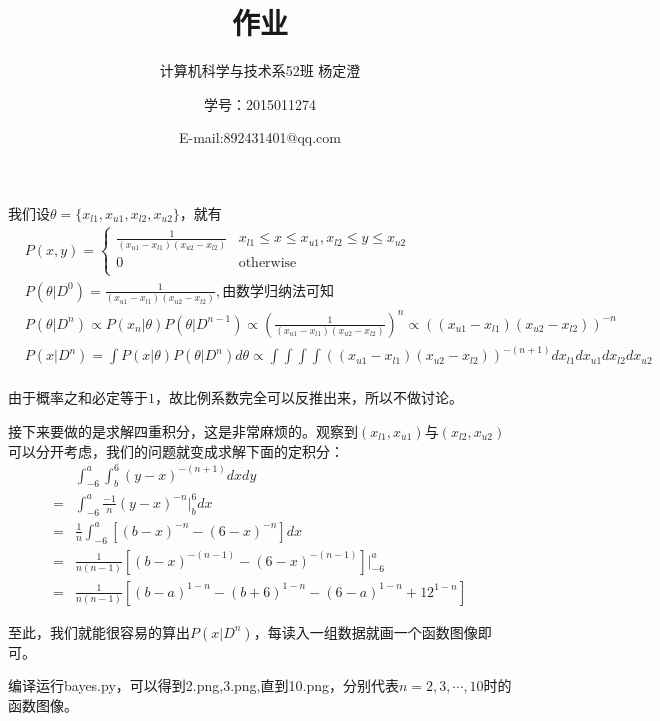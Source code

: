 \documentclass{ctexart}
\begin{document}
\title{作业}
\author{计算机科学与技术系52班 杨定澄 \and 学号：2015011274 \and E-mail:892431401@qq.com}
\date{}
\maketitle
我们设$\theta=\{x_{l1},x_{u1},x_{l2},x_{u2}\}$，就有
\begin{align*}
&P(x,y)=
\begin{cases}
\frac{1}{(x_{u1}-x_{l1})(x_{u2}-x_{l2})} & x_{l1} \le x \le x_{u1},x_{l2} \le y \le x_{u2} \\
0 & \textrm{otherwise} \\
\end{cases}
\\
&P(\theta|D^0)=\frac{1}{(x_{u1}-x_{l1})(x_{u2}-x_{l2})},\textrm{由数学归纳法可知}\\
&P(\theta|D^n)\propto	P(x_n|\theta)P(\theta|D^{n-1})\propto (\frac{1}{(x_{u1}-x_{l1})(x_{u2}-x_{l2})})^{n}\propto ((x_{u1}-x_{l1})(x_{u2}-x_{l2}))^{-n}\\
&P(x|D^n)=\int P(x|\theta)P(\theta|D^n) d\theta \propto \int \int \int \int ((x_{u1}-x_{l1})(x_{u2}-x_{l2}))^{-(n+1)}dx_{l1}dx_{u1}dx_{l2}dx_{u2}\\
\end{align*}

由于概率之和必定等于$1$，故比例系数完全可以反推出来，所以不做讨论。

接下来要做的是求解四重积分，这是非常麻烦的。观察到$(x_{l1},x_{u1})$与$(x_{l2},x_{u2})$可以分开考虑，我们的问题就变成求解下面的定积分：
\begin{align*}
&\int_{-6}^a\int_{b}^6(y-x)^{-(n+1)}dxdy \\
=& \int_{-6}^a \frac{-1}{n}(y-x)^{-n}\Big|_b^6 dx\\
=& \frac{1}{n}\int_{-6}^a [(b-x)^{-n}-(6-x)^{-n}]dx\\
=& \frac{1}{n(n-1)}[(b-x)^{-(n-1)}-(6-x)^{-(n-1)}]\Big|_{-6}^a\\
=& \frac{1}{n(n-1)}[(b-a)^{1-n}-(b+6)^{1-n}-(6-a)^{1-n}+12^{1-n}]
\end{align*}

至此，我们就能很容易的算出$P(x|D^n)$，每读入一组数据就画一个函数图像即可。

编译运行bayes.py，可以得到2.png,3.png,直到10.png，分别代表$n=2,3,\cdots,10$时的函数图像。
\end{document}
